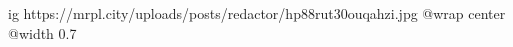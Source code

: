  
 
 
 
 

\ifcmt
  ig https://mrpl.city/uploads/posts/redactor/hp88rut30ouqahzi.jpg
  @wrap center
  @width 0.7
\fi
